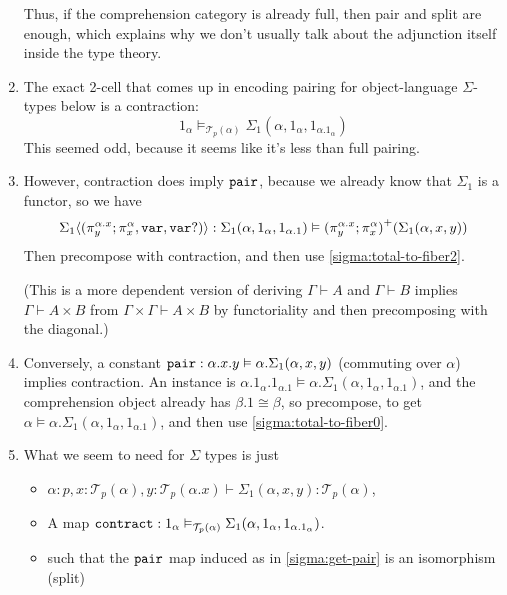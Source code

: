 \documentclass[10pt]{article}
\theoremstyle{definition}
\newcommand\TrPlus[2]{\ensuremath{{#1}^+(#2)}}
\newcommand\El[2]{\mathcal{T}_{#1}(#2)}
\newcommand\ap[2]{\ensuremath{#1 \langle #2 \rangle }}
\begin{document}
\begin{enumerate}
  Thus, if the comprehension category is already full, then pair and
  split are enough, which explains why we don't usually talk about the
  adjunction itself inside the type theory.  
  
\item The exact 2-cell that comes up in encoding pairing for
  object-language $\Sigma$-types below is a contraction:
  \[
  1_\alpha \vDash_{\El{p}{\alpha}} \Sigma_1(\alpha,1_\alpha,1_{\alpha.{1_\alpha}})
  \]
  This seemed odd, because it seems like it's less than full pairing.    

\item \label{sigma:get-pair} However, contraction does imply
  $\mathtt{pair}$, because we already know that $\Sigma_1$ is a functor, so
  we have
  \[
  \ap{\Sigma_1}{(\pi^{\alpha.x}_y;\pi^\alpha_x, \mtt{var}, \mtt{var}?)} :
  \Sigma_1(\alpha,1_\alpha,1_{\alpha.1}) \vDash \TrPlus{(\pi^{\alpha.x}_y;\pi^\alpha_x)}{\Sigma_1(\alpha,x,y)}
  \]
  Then precompose with contraction, and then use
  \ref{sigma:total-to-fiber2}.

  (This is a more dependent version of deriving $\Gamma \vdash A$ and
  $\Gamma \vdash B$ implies $\Gamma \vdash A \times B$ from $\Gamma
  \times \Gamma \vdash A \times B$ by functoriality and then
  precomposing with the diagonal.)
  
\item Conversely, a constant $\mathtt{pair} : \alpha.x.y \vDash
  \alpha.\Sigma_1(\alpha,x,y)$ (commuting over $\alpha$) implies
  contraction. An instance is $\alpha.1_{\alpha}.1_{\alpha.1} \vDash
  \alpha.\Sigma_1(\alpha,1_\alpha,1_{\alpha.1})$, and the comprehension
  object already has $\beta.1 \cong \beta$, so precompose, to get
  $\alpha \vDash \alpha.\Sigma_1(\alpha,1_\alpha,1_{\alpha.1})$, and
  then use \ref{sigma:total-to-fiber0}.

\item \label{sigma:spec} What we seem to need for $\Sigma$ types is just
  \begin{itemize}
  \item $\alpha : p, x : \El{p}{\alpha}, y : \El{p}{\alpha.x} \vdash \Sigma_1(\alpha,x,y) : \El{p}{\alpha}$,
  \item A map $\mtt{contract} : 1_\alpha \vDash_{\El{p}{\alpha}} \Sigma_1(\alpha,1_\alpha,1_{\alpha.{1_\alpha}})$.
  \item such that the $\mathtt{pair}$ map induced as in
    \ref{sigma:get-pair} is an isomorphism (split)
  \end{itemize}


\end{enumerate}
\end{document}
